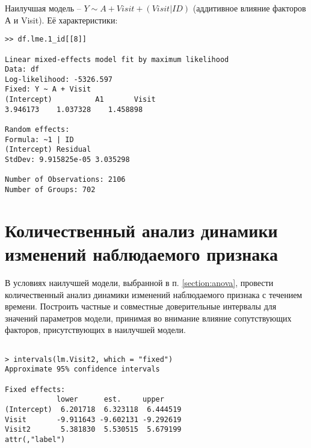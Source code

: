 \documentclass[a4paper,12pt]{article}
\begin{document}
Наилучшая модель -- $ Y \sim A + Visit +(Visit | ID) $  (аддитивное влияние факторов А и Visit).
Её характеристики:

\begin{verbatim}
>> df.lme.1_id[[8]]

Linear mixed-effects model fit by maximum likelihood
Data: df
Log-likelihood: -5326.597
Fixed: Y ~ A + Visit
(Intercept)          A1       Visit
3.946173    1.037328    1.458898

Random effects:
Formula: ~1 | ID
(Intercept) Residual
StdDev: 9.915825e-05 3.035298

Number of Observations: 2106
Number of Groups: 702
\end{verbatim}

\section{ Количественный анализ динамики изменений наблюдаемого признака }

\begin{leftbar}
В условиях наилучшей модели, выбранной в п. \ref{section:anova}, провести количественный анализ динамики изменений наблюдаемого признака с течением времени.
Построить частные и совместные доверительные интервалы для значений параметров модели, принимая во внимание влияние сопутствующих факторов, присутствующих в наилучшей модели.
\end{leftbar}

\begin{verbatim}

> intervals(lm.Visit2, which = "fixed")
Approximate 95% confidence intervals

Fixed effects:
            lower      est.     upper
(Intercept)  6.201718  6.323118  6.444519
Visit       -9.911643 -9.602131 -9.292619
Visit2       5.381830  5.530515  5.679199
attr(,"label")

\end{verbatim}
\end{document}

